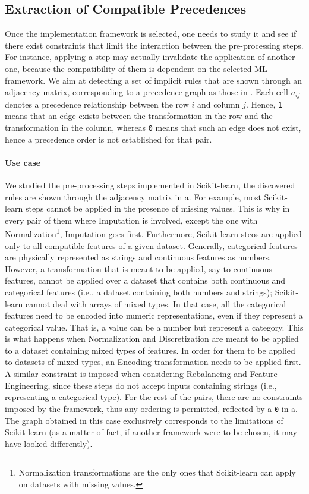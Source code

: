 \subsection{Extraction of Compatible Precedences}
\label{effective-ssec:rules-framework}

Once the implementation framework is selected, one needs to study it and see if there exist constraints that limit the interaction between the pre-processing steps.
For instance, applying a step may actually invalidate the application of another one, because the compatibility of them is dependent on the selected ML framework.
We aim at detecting a set of implicit rules that are shown through an adjacency matrix, corresponding to a precedence graph as those in .
Each cell $a_{ij}$ denotes a precedence relationship between the row $i$ and column $j$.
Hence, \texttt{1} means that an edge exists between the transformation in the row and the transformation in the column, whereas \texttt{0} means that such an edge does not exist, hence a precedence order is not established for that pair.

\paragraph{Use case}
We studied the pre-processing steps implemented in Scikit-learn, the discovered rules are shown through the adjacency matrix in a.
For example, most Scikit-learn steps cannot be applied in the presence of missing values.
This is why in every pair of them where Imputation is involved, except the one with Normalization\footnote{Normalization transformations are the only ones that Scikit-learn can apply on datasets with missing values.}, Imputation goes first.
Furthermore, Scikit-learn steos are applied only to all compatible features of a given dataset.
Generally, categorical features are physically represented as strings and continuous features as numbers.
However, a transformation that is meant to be applied, say to continuous features, cannot be applied over a dataset that contains both continuous and categorical features (i.e., a dataset containing both numbers and strings); Scikit-learn cannot deal with arrays of mixed types.
In that case, all the categorical features need to be encoded into numeric representations, even if they represent a categorical value.
That is, a value can be a number but represent a category.
This is what happens when Normalization and Discretization are meant to be applied to a dataset containing mixed types of features.
In order for them to be applied to datasets of mixed types, an Encoding transformation needs to be applied first.
A similar constraint is imposed when considering Rebalancing and Feature Engineering, since these steps do not accept inputs containing strings (i.e., representing a categorical type).
For the rest of the pairs, there are no constraints imposed by the framework, thus any ordering is permitted, reflected by a \texttt{0} in a.
The graph obtained in this case exclusively corresponds to the limitations of Scikit-learn (as a matter of fact, if another framework were to be chosen, it may have looked differently).


